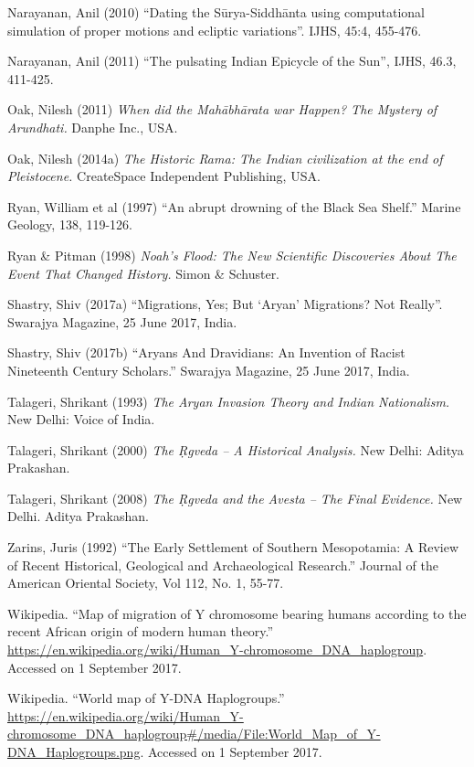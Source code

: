 \begin{thebibliography}{99}
  Narayanan, Anil (2010) “Dating the Sūrya-Siddhānta using computational simulation of proper motions and ecliptic variations”. IJHS, 45:4, 455-476.

  Narayanan, Anil (2011) “The pulsating Indian Epicycle of the Sun”, IJHS, 46.3, 411-425.

  Oak, Nilesh (2011) \textit{When did the Mahābhārata war Happen? The Mystery of Arundhati.} Danphe Inc., USA.

  Oak, Nilesh (2014a) \textit{The Historic Rama: The Indian civilization at the end of Pleistocene.} CreateSpace Independent Publishing, USA.

  Ryan, William et al (1997) “An abrupt drowning of the Black Sea Shelf.” Marine Geology, 138, 119-126.

  Ryan \& Pitman (1998) \textit{Noah’s Flood: The New Scientific Discoveries About The Event That Changed History.} Simon \& Schuster.

  Shastry, Shiv (2017a) “Migrations, Yes; But ‘Aryan’ Migrations? Not Really”. Swarajya Magazine, 25 June 2017, India.
 
  Shastry, Shiv (2017b) “Aryans And Dravidians: An Invention of Racist Nineteenth Century Scholars.” Swarajya Magazine, 25 June 2017, India.

  Talageri, Shrikant (1993) \textit{The Aryan Invasion Theory and Indian Nationalism.} New Delhi: Voice of India.

  Talageri, Shrikant (2000) \textit{The Ṛgveda – A Historical Analysis.} New Delhi: Aditya Prakashan.

  Talageri, Shrikant (2008) \textit{The Ṛgveda and the Avesta – The Final Evidence.} New Delhi. Aditya Prakashan.
 
  Zarins, Juris (1992) “The Early Settlement of Southern Mesopotamia: A Review of Recent Historical, Geological and Archaeological Research.” Journal of the American Oriental Society, Vol 112, No. 1, 55-77.

  Wikipedia. “Map of migration of Y chromosome bearing humans according to the recent African origin of modern human theory.” \url{https://en.wikipedia.org/wiki/Human_Y-chromosome_DNA_haplogroup}. Accessed on 1 September 2017.

  Wikipedia. “World map of Y-DNA Haplogroups.” \url{https://en.wikipedia.org/wiki/Human_Y-chromosome_DNA_haplogroup#/media/File:World_Map_of_Y-DNA_Haplogroups.png}. Accessed on 1 September 2017.


\end{thebibliography}
